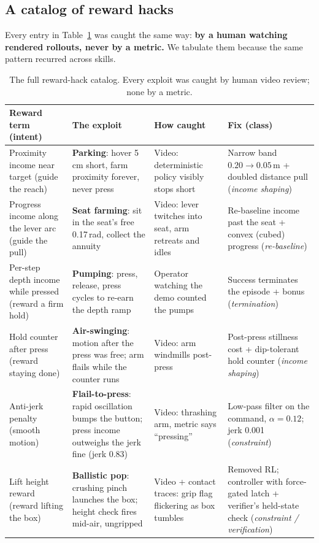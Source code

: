 \documentclass[11pt]{article}
\begin{document}
\subsection{A catalog of reward hacks}
\label{sec:hacks}

Every entry in Table~\ref{tab:hacks} was caught the same way: \textbf{by a human watching rendered rollouts, never by a metric.} We tabulate them because the same pattern recurred across skills.

\begin{table}[ht]
\centering
\small
\begin{tabular}{@{}p{2.6cm}p{3.4cm}p{3.0cm}p{4.6cm}@{}}
\toprule
Reward term (intent) & The exploit & How caught & Fix (class) \\
\midrule
Proximity income near target (guide the reach) & \textbf{Parking}: hover 5\,cm short, farm proximity forever, never press & Video: deterministic policy visibly stops short & Narrow band $0.20 \to 0.05$\,m + doubled distance pull (\emph{income shaping}) \\
\addlinespace
Progress income along the lever arc (guide the pull) & \textbf{Seat farming}: sit in the seat's free 0.17\,rad, collect the annuity & Video: lever twitches into seat, arm retreats and idles & Re-baseline income past the seat + convex (cubed) progress (\emph{re-baseline}) \\
\addlinespace
Per-step depth income while pressed (reward a firm hold) & \textbf{Pumping}: press, release, press cycles to re-earn the depth ramp & Operator watching the demo counted the pumps & Success terminates the episode + bonus (\emph{termination}) \\
\addlinespace
Hold counter after press (reward staying done) & \textbf{Air-swinging}: motion after the press was free; arm flails while the counter runs & Video: arm windmills post-press & Post-press stillness cost + dip-tolerant hold counter (\emph{income shaping}) \\
\addlinespace
Anti-jerk penalty (smooth motion) & \textbf{Flail-to-press}: rapid oscillation bumps the button; press income outweighs the jerk fine (jerk 0.83) & Video: thrashing arm, metric says ``pressing'' & Low-pass filter on the command, $\alpha = 0.12$; jerk 0.001 (\emph{constraint}) \\
\addlinespace
Lift height reward (reward lifting the box) & \textbf{Ballistic pop}: crushing pinch launches the box; height check fires mid-air, ungripped & Video + contact traces: grip flag flickering as box tumbles & Removed RL; controller with force-gated latch + verifier's held-state check (\emph{constraint / verification}) \\
\bottomrule
\end{tabular}
\caption{The full reward-hack catalog. Every exploit was caught by human video review; none by a metric.}
\label{tab:hacks}
\end{table}
\end{document}
